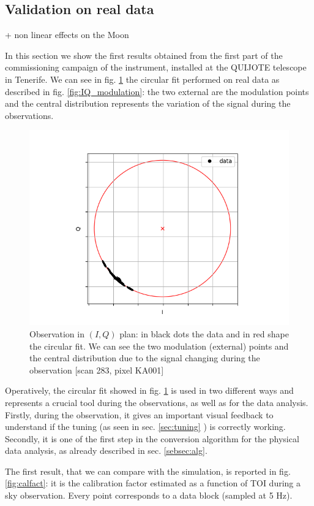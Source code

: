 \documentclass[twocolumn,traditabstract]{aa}\\
\begin{document}
\subsection{Validation on real data}
+ non linear effects on the Moon

In this section we show the first results obtained from the first part of the commissioning campaign of the instrument, installed at the QUIJOTE telescope in Tenerife. We can see in fig. \ref{fig:circle} the circular fit performed on real data as described in fig. \ref{fig:IQ_modulation}: the two external are the modulation points and the central distribution represents the variation of the signal during the observations.


\begin{figure}[htf]
	\centering
	\includegraphics[width=.5\textwidth]{4.results/circular_fit.png}
	\caption{Observation in $(I,Q)$ plan: in black dots the data and in red shape the circular fit. We can see the two modulation (external) points and the central distribution due to the signal changing during the observation [scan 283, pixel KA001]}
	\label{fig:circle}
\end{figure}

\noindent Operatively, the circular fit showed in fig. \ref{fig:circle} is used in two different ways and represents a crucial tool during the observations, as well as for the data analysis. Firstly, during the observation, it gives an important visual feedback to understand if the tuning (as seen in sec. \ref{sec:tuning} ) is correctly working. Secondly, it is one of the first step in the conversion algorithm for the physical data analysis, as already described in sec. \ref{sebsec:alg}.

The first result, that we can compare with the simulation, is reported in fig. \ref{fig:calfact}: it is the calibration factor estimated as a function of TOI during a sky observation. Every point corresponds to a data block (sampled at 5 Hz).
\end{document}
